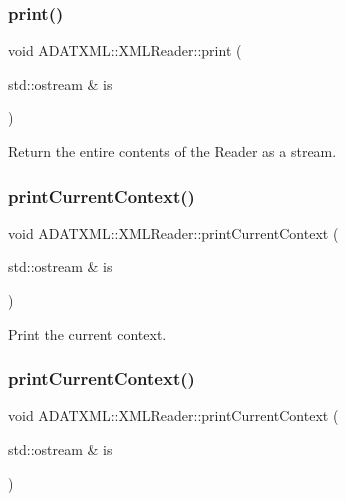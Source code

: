 \subsubsection{\texorpdfstring{print()}{print()}\hspace{0.1cm}{\footnotesize\ttfamily [2/2]}}
{\footnotesize\ttfamily void A\+D\+A\+T\+X\+M\+L\+::\+X\+M\+L\+Reader\+::print (\begin{DoxyParamCaption}\item[{std\+::ostream \&}]{is }\end{DoxyParamCaption})}



Return the entire contents of the Reader as a stream. 

\mbox{\label{classADATXML_1_1XMLReader_a424f9e30746b4fdc106b57b5ce95f7ec}} 
\subsubsection{\texorpdfstring{printCurrentContext()}{printCurrentContext()}\hspace{0.1cm}{\footnotesize\ttfamily [1/2]}}
{\footnotesize\ttfamily void A\+D\+A\+T\+X\+M\+L\+::\+X\+M\+L\+Reader\+::print\+Current\+Context (\begin{DoxyParamCaption}\item[{std\+::ostream \&}]{is }\end{DoxyParamCaption})}



Print the current context. 

\mbox{\label{classADATXML_1_1XMLReader_a424f9e30746b4fdc106b57b5ce95f7ec}} 
\subsubsection{\texorpdfstring{printCurrentContext()}{printCurrentContext()}\hspace{0.1cm}{\footnotesize\ttfamily [2/2]}}
{\footnotesize\ttfamily void A\+D\+A\+T\+X\+M\+L\+::\+X\+M\+L\+Reader\+::print\+Current\+Context (\begin{DoxyParamCaption}\item[{std\+::ostream \&}]{is }\end{DoxyParamCaption})}



